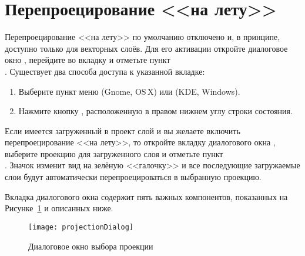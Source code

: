 \section{Перепроецирование <<на лету>>}\label{label_projstart}

Перепроецирование <<на лету>> по умолчанию отключено и, в принципе, доступно
только для векторных слоёв. Для его активации откройте диалоговое окно
, перейдите во вкладку
 и отметьте пункт \\
. Существует два
способа доступа к указанной вкладке:

\begin{enumerate}
\item Выберите пункт  меню
 (Gnome, OS\,X) или  (KDE,
Windows).
\item Нажмите кнопку , расположенную в правом нижнем углу строки состояния.
\end{enumerate}

Если имеется загруженный в проект слой и вы желаете включить перепроецирование
<<на лету>>, то откройте вкладку  диалогового окна
, выберите проекцию для загруженного слоя и
отметьте пункт \\
. Значок
 изменит вид
на зелёную <<галочку>> и все последующие загружаемые слои будут автоматически
перепроецироваться в выбранную проекцию.

Вкладка  диалогового окна 
содержит пять важных компонентов, показанных на Рисунке~\ref{fig:projections} и
описанных ниже.

\begin{figure}[ht]
   \centering
   \texttt{[image: projectionDialog]}
   \caption{Диалоговое окно выбора проекции \wincaption}\label{fig:projections}
\end{figure}

